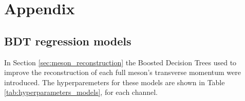 \chapter*{Appendix}\label{chap:appendix}

\section*{BDT regression models}\label{sec:appendix_models}


In Section \ref{sec:meson_reconstruction} the Boosted Decision Trees used to improve the reconstruction of each full meson's transverse momentum were introduced. The hyperparemeters for these models are shown in Table \ref{tab:hyperparameters_models}, for each channel.


